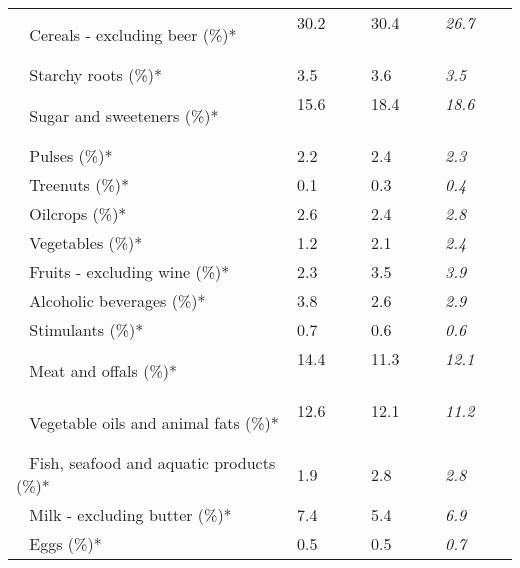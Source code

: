 \begin{tabular}{L{3.9cm} R{1cm} R{1cm} R{1cm}}
	 ~ Cereals - excluding beer (\%)* & 30.2 ~ \ \ & 30.4 ~ \ \ & \textit{26.7} ~ \ \ \\ 
	 ~ Starchy roots (\%)* & 3.5 ~ \ \ & 3.6 ~ \ \ & \textit{3.5} ~ \ \ \\ 
	 ~ Sugar and sweeteners (\%)* & 15.6 ~ \ \ & 18.4 ~ \ \ & \textit{18.6} ~ \ \ \\ 
	 ~ Pulses (\%)* & 2.2 ~ \ \ & 2.4 ~ \ \ & \textit{2.3} ~ \ \ \\ 
	 ~ Treenuts (\%)* & 0.1 ~ \ \ & 0.3 ~ \ \ & \textit{0.4} ~ \ \ \\ 
	 ~ Oilcrops (\%)* & 2.6 ~ \ \ & 2.4 ~ \ \ & \textit{2.8} ~ \ \ \\ 
	 ~ Vegetables (\%)* & 1.2 ~ \ \ & 2.1 ~ \ \ & \textit{2.4} ~ \ \ \\ 
	 ~ Fruits - excluding wine (\%)* & 2.3 ~ \ \ & 3.5 ~ \ \ & \textit{3.9} ~ \ \ \\ 
	 ~ Alcoholic beverages (\%)* & 3.8 ~ \ \ & 2.6 ~ \ \ & \textit{2.9} ~ \ \ \\ 
	 ~ Stimulants (\%)* & 0.7 ~ \ \ & 0.6 ~ \ \ & \textit{0.6} ~ \ \ \\ 
	 ~ Meat and offals (\%)* & 14.4 ~ \ \ & 11.3 ~ \ \ & \textit{12.1} ~ \ \ \\ 
	 ~ Vegetable oils and animal fats (\%)* & 12.6 ~ \ \ & 12.1 ~ \ \ & \textit{11.2} ~ \ \ \\ 
	 ~ Fish, seafood and aquatic products (\%)* & 1.9 ~ \ \ & 2.8 ~ \ \ & \textit{2.8} ~ \ \ \\ 
	 ~ Milk - excluding butter (\%)* & 7.4 ~ \ \ & 5.4 ~ \ \ & \textit{6.9} ~ \ \ \\ 
	 ~ Eggs (\%)* & 0.5 ~ \ \ & 0.5 ~ \ \ & \textit{0.7} ~ \ \ \\ 
       \toprule
      \end{tabular}
      \clearpage
{}
